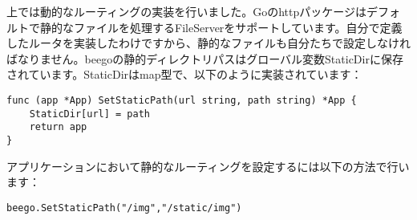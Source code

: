 上では動的なルーティングの実装を行いました。Goのhttpパッケージはデフォルトで静的なファイルを処理するFileServerをサポートしています。自分で定義したルータを実装したわけですから、静的なファイルも自分たちで設定しなければなりません。beegoの静的ディレクトリパスはグローバル変数StaticDirに保存されています。StaticDirはmap型で、以下のように実装されています：

\begin{lstlisting}[numbers=none]
func (app *App) SetStaticPath(url string, path string) *App {
    StaticDir[url] = path
    return app
}
\end{lstlisting}

アプリケーションにおいて静的なルーティングを設定するには以下の方法で行います：

\begin{lstlisting}[numbers=none]
beego.SetStaticPath("/img","/static/img")
\end{lstlisting}

